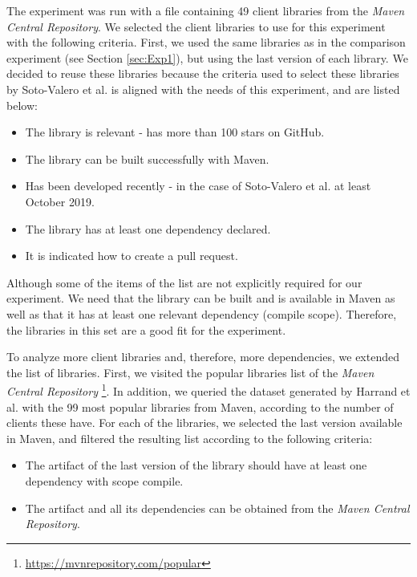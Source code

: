\blankl
The experiment was run with a file containing 49 client libraries from the \textit{Maven Central Repository}.  We selected the client libraries to use for this experiment with the following criteria. First, we used the same libraries as in the comparison experiment (see Section \ref{sec:Exp1}), but using the last version of each library. We decided to reuse these libraries because the criteria used to select these libraries by Soto-Valero et al. \cite{soto2020comprehensive} is aligned with the needs of this experiment, and are listed below:

\begin{itemize}
  \item The library is relevant - has more than 100 stars on GitHub.
  \item The library can be built successfully with Maven.
  \item Has been developed recently - in the case of Soto-Valero et al. at least October 2019.
  \item The library has at least one dependency declared.
  \item It is indicated how to create a pull request.
\end{itemize}

Although some of the items of the list are not explicitly required for our experiment. We need that the library can be built and is available in Maven as well as that it has at least one relevant dependency (compile scope). Therefore, the libraries in this set are a good fit for the experiment.

To analyze more client libraries and, therefore, more dependencies, we extended the list of libraries. First, we visited the popular libraries list of the \textit{Maven Central Repository} \footnote{\url{https://mvnrepository.com/popular}}. In addition, we queried the dataset generated by Harrand et al. \cite{Harrand2019} with the 99 most popular libraries from Maven, according to the number of clients these have. For each of the libraries, we selected the last version available in Maven, and filtered the resulting list according to the following criteria:

\begin{itemize}
  \item The artifact of the last version of the library should have at least one dependency with scope compile.
  \item The artifact and all its dependencies can be obtained from the \textit{Maven Central Repository}.
\end{itemize}

